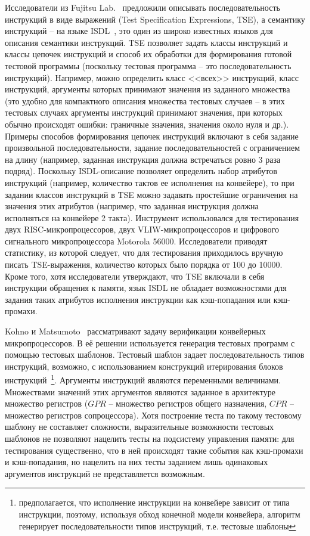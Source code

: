 Исследователи из Fujitsu Lab.~\cite{TSE} предложили описывать последовательность инструкций в виде выражений (Test Specification Expressions, TSE), а семантику инструкций -- на языке ISDL~\cite{ISDL}, это один из широко известных языков для описания семантики инструкций. TSE позволяет задать классы инструкций и классы цепочек инструкций и способ их обработки  для формирования готовой тестовой программы (поскольку тестовая программа -- это последовательность инструкций). Например, можно определить класс <<всех>> инструкций, класс инструкций, аргументы которых принимают значения из заданного множества (это удобно для компактного описания множества тестовых случаев -- в этих тестовых случаях аргументы инструкций принимают значения, при которых обычно происходят ошибки: граничные значения, значения около нуля и др.). Примеры способов формирования цепочек инструкций включают в себя задание произвольной последовательности, задание последовательностей с ограничением на длину (например, заданная инструкция должна встречаться ровно 3 раза подряд). Поскольку ISDL-описание позволяет определить набор атрибутов инструкций (например, количество тактов ее исполнения на конвейере), то при задании классов инструкций в TSE можно задавать простейшие ограничения на значения этих атрибутов (например, что заданная инструкция должна исполняться на конвейере 2 такта). Инструмент использовался для тестирования двух RISC-микропроцессоров, двух VLIW-микропроцессоров и цифрового сигнального микропроцессора Motorola 56000. Исследователи приводят статистику, из которой следует, что для тестирования приходилось вручную писать TSE-выражения, количество которых было порядка от 100 до 10000. Кроме того, хотя исследователи утверждают, что TSE включали в себя инструкции обращения к памяти, язык ISDL не обладает возможностями для задания таких атрибутов исполнения инструкции как кэш-попадания или кэш-промахи.

Kohno и Matsumoto~\cite{mVpGen} рассматривают задачу верификации конвейерных микропроцессоров. В её решении используется генерация тестовых программ с помощью тестовых шаблонов. Тестовый шаблон задает последовательность типов инструкций, возможно, с
использованием конструкций итерирования блоков инструкций~\footnote{предполагается, что исполнение инструкции на конвейере зависит от типа инструкции, поэтому, используя обход конечной модели конвейера, алгоритм генерирует последовательности типов инструкций, т.е.
тестовые шаблоны}. Аргументы инструкций являются переменными величинами. Множествами значений этих аргументов являются заданное в архитектуре множество регистров ($GPR$ -- множество регистров общего назначения, $CPR$ -- множество регистров сопроцессора). Хотя построение теста по такому тестовому шаблону не составляет сложности, выразительные возможности тестовых шаблонов не позволяют нацелить тесты на подсистему управления памяти: для тестирования существенно, что в ней происходят такие события как кэш-промахи и кэш-попадания, но нацелить на них тесты заданием лишь одинаковых аргументов инструкций не представляется возможным.

